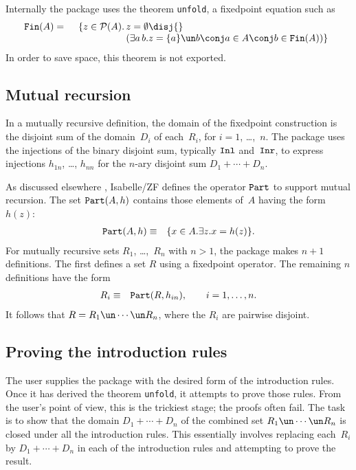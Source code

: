 Internally the package uses the theorem {\tt unfold}, a fixedpoint equation
such as
\begin{eqnarray*}
  \Fin(A) & = &
  \begin{array}[t]{r@{\,}l}
     \{z\in\pow(A). & z=\emptyset \disj{} \\
             &(\exists a\,b. z=\{a\}\un b\conj a\in A\conj b\in \Fin(A))\}
  \end{array}
\end{eqnarray*}
In order to save space, this theorem is not exported.  


\subsection{Mutual recursion} \label{mutual-sec}
In a mutually recursive definition, the domain of the fixedpoint construction
is the disjoint sum of the domain~$D_i$ of each~$R_i$, for $i=1$,
\ldots,~$n$.  The package uses the injections of the
binary disjoint sum, typically $\hbox{\tt Inl}$ and~$\hbox{\tt Inr}$, to express injections
$h_{1n}$, \ldots, $h_{nn}$ for the $n$-ary disjoint sum $D_1+\cdots+D_n$.

As discussed elsewhere \cite[\S4.5]{paulson-set-II}, Isabelle/ZF defines the
operator $\hbox{\tt Part}$ to support mutual recursion.  The set $\hbox{\tt Part}(A,h)$
contains those elements of~$A$ having the form~$h(z)$:
\begin{eqnarray*}
   \hbox{\tt Part}(A,h)  & \equiv & \{x\in A. \exists z. x=h(z)\}.
\end{eqnarray*}   
For mutually recursive sets $R_1$, \ldots,~$R_n$ with
$n>1$, the package makes $n+1$ definitions.  The first defines a set $R$ using
a fixedpoint operator. The remaining $n$ definitions have the form
\begin{eqnarray*}
  R_i & \equiv & \hbox{\tt Part}(R,h_{in}), \qquad i=1,\ldots, n.
\end{eqnarray*} 
It follows that $R=R_1\un\cdots\un R_n$, where the $R_i$ are pairwise disjoint.


\subsection{Proving the introduction rules}
The user supplies the package with the desired form of the introduction
rules.  Once it has derived the theorem {\tt unfold}, it attempts
to prove those rules.  From the user's point of view, this is the
trickiest stage; the proofs often fail.  The task is to show that the domain 
$D_1+\cdots+D_n$ of the combined set $R_1\un\cdots\un R_n$ is
closed under all the introduction rules.  This essentially involves replacing
each~$R_i$ by $D_1+\cdots+D_n$ in each of the introduction rules and
attempting to prove the result.

